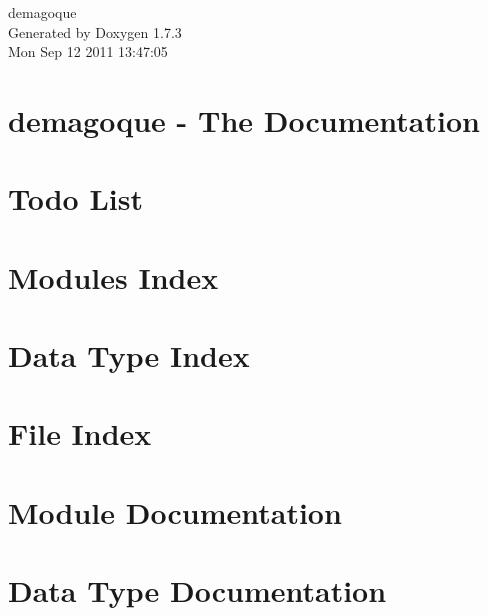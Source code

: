 \documentclass[a4paper]{book}
\begin{document}
\hypersetup{pageanchor=false}
\begin{titlepage}
\vspace*{7cm}
\begin{center}
{\Large demagoque }\\
\vspace*{1cm}
{\large Generated by Doxygen 1.7.3}\\
\vspace*{0.5cm}
{\small Mon Sep 12 2011 13:47:05}\\
\end{center}
\end{titlepage}
\clearemptydoublepage
{}
\tableofcontents
\clearemptydoublepage
{}
\hypersetup{pageanchor=true}
\chapter{demagoque -\/ The Documentation}
\label{index}\hypertarget{index}{}
\chapter{Todo List}
\label{todo}
\hypertarget{todo}{}

\chapter{Modules Index}

\chapter{Data Type Index}

\chapter{File Index}

\chapter{Module Documentation}



















\chapter{Data Type Documentation}



\end{document}
